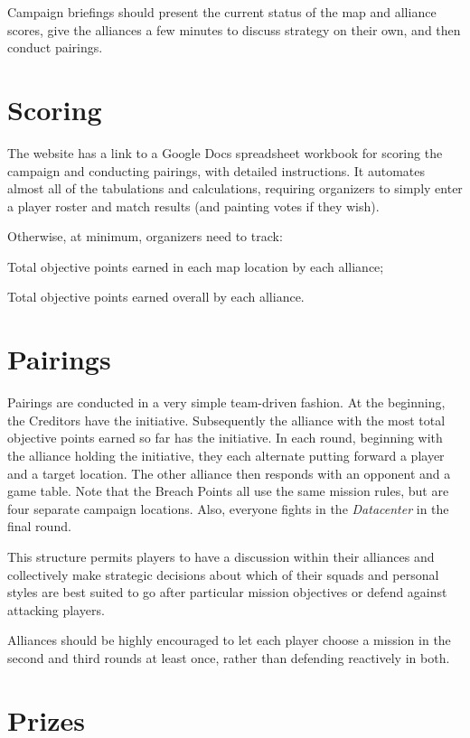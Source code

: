 \documentclass{tokh}
\begin{document}
\bigskip%
Campaign briefings should present the current status of the map and
alliance scores, give the alliances a few minutes to discuss strategy
on their own, and then conduct pairings.

\section{Scoring}

The website has a link to a Google Docs spreadsheet workbook for
scoring the campaign and conducting pairings, with detailed
instructions.  It automates almost all of the tabulations and
calculations, requiring organizers to simply enter a player roster and
match results (and painting votes if they wish).

Otherwise, at minimum, organizers need to track:
\begin{squishitemize}
\item Total objective points earned in each map location by each alliance;
\item Total objective points earned overall by each alliance.
\end{squishitemize}

\section{Pairings}

Pairings are conducted in a very simple team-driven fashion.  At the
beginning, the Creditors have the initiative.  Subsequently the
alliance with the most total objective points earned so far has the
initiative.  In each round, beginning with the alliance holding the
initiative, they each alternate putting forward a player and a target
location.  The other alliance then responds with an opponent and a
game table.  Note that the Breach Points all use the same mission
rules, but are four separate campaign locations.  Also, everyone
fights in the \textit{Datacenter} in the final round.

This structure permits players to have a discussion within their
alliances and collectively make strategic decisions about which of
their squads and personal styles are best suited to go after
particular mission objectives or defend against attacking players.

Alliances should be highly encouraged to let each player choose a
mission in the second and third rounds at least once, rather than
defending reactively in both.

\section{Prizes}
\end{document}
